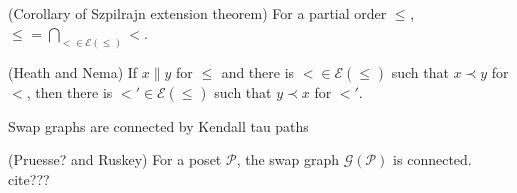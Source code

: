 \documentclass[12pt]{llncs}
\let\oldleq\leq
\renewcommand{\leq}[1][]{\oldleq_{#1}}
\newcommand{\poset}[1]{\mathcal{#1}}
\newcommand{\incomp}{\parallel}
\newcommand{\covered}{\prec}
\begin{document}
{\begin{theorem}
    (Corollary of Szpilrajn extension theorem) For a partial order $\leq$, $\leq = \bigcap_{< \in \mathcal{E}(\leq)} <$.
\end{theorem}

\begin{theorem}
    (Heath and Nema) If $x \incomp y$ for $\leq$ and there is $< \in \mathcal{E}(\leq)$ such that $x \covered y$ for $<$, then there is $<' \in \mathcal{E}(\leq)$ such that $y \covered x$ for $<'$.
\end{theorem}

\begin{theorem}
    Swap graphs are connected by Kendall tau paths
\end{theorem}

\begin{theorem}
    \label{theorem:szpilrajn}
\end{theorem}

\begin{theorem}
    (Pruesse? and Ruskey) For a poset $\poset{P}$, the swap graph $\mathcal{G}(\poset{P})$ is connected. cite???
\end{theorem}

}
\end{document}
